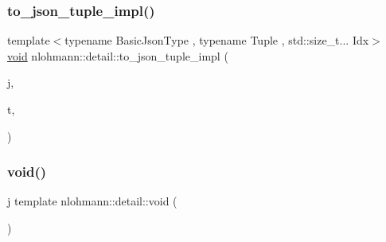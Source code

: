 \mbox{\label{namespacenlohmann_1_1detail_a510dfa15b01e9a8afe31600a27b28199}} 
\subsubsection{\texorpdfstring{to\+\_\+json\+\_\+tuple\+\_\+impl()}{to\_json\_tuple\_impl()}}
{\footnotesize\ttfamily template$<$typename Basic\+Json\+Type , typename Tuple , std\+::size\+\_\+t... Idx$>$ \\
\hyperlink{namespacenlohmann_1_1detail_a59fca69799f6b9e366710cb9043aa77d}{void} nlohmann\+::detail\+::to\+\_\+json\+\_\+tuple\+\_\+impl (\begin{DoxyParamCaption}\item[{Basic\+Json\+Type \&}]{j,  }\item[{const Tuple \&}]{t,  }\item[{\hyperlink{structnlohmann_1_1detail_1_1index__sequence}{index\+\_\+sequence}$<$ Idx... $>$}]{ }\end{DoxyParamCaption})}

\mbox{\label{namespacenlohmann_1_1detail_a59fca69799f6b9e366710cb9043aa77d}} 
\subsubsection{\texorpdfstring{void()}{void()}}
{\footnotesize\ttfamily j template nlohmann\+::detail\+::void (\begin{DoxyParamCaption}{ }\end{DoxyParamCaption})}

